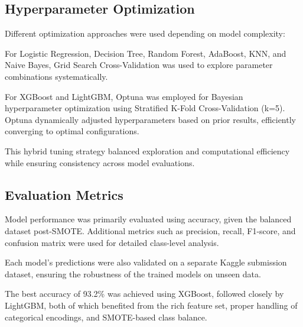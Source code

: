\subsection{Hyperparameter Optimization}\label{subsec:hyperparameter-optimization}
Different optimization approaches were used depending on model complexity:

For Logistic Regression, Decision Tree, Random Forest, AdaBoost, KNN, and Naive Bayes, Grid Search Cross-Validation was used to explore parameter combinations systematically.

For XGBoost and LightGBM, Optuna was employed for Bayesian hyperparameter optimization using Stratified K-Fold Cross-Validation (k=5).
Optuna dynamically adjusted hyperparameters based on prior results, efficiently converging to optimal configurations.

This hybrid tuning strategy balanced exploration and computational efficiency while ensuring consistency across model evaluations.

\subsection{Evaluation Metrics}\label{subsec:evaluation-metrics}
Model performance was primarily evaluated using accuracy, given the balanced dataset post-SMOTE.
Additional metrics such as precision, recall, F1-score, and confusion matrix were used for detailed class-level analysis.

Each model’s predictions were also validated on a separate Kaggle submission dataset, ensuring the robustness of the trained models on unseen data.

The best accuracy of 93.2\% was achieved using XGBoost, followed closely by LightGBM, both of which benefited from the rich feature set, proper handling of categorical encodings, and SMOTE-based class balance.
